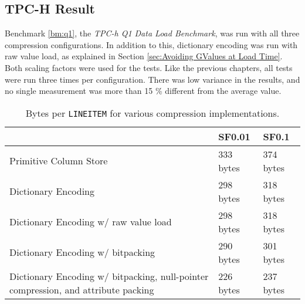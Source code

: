 \subsection{TPC-H Result}
\label{sub:TPC-H Result}
Benchmark \ref{bm:q1}, the \textit{TPC-h Q1 Data Load Benchmark}, was run with all three compression configurations. In addition to this, dictionary encoding was run with raw value load, as explained in Section \ref{sec:Avoiding GValues at Load Time}. Both scaling factors were used for the tests. Like the previous chapters, all tests were run three times per configuration. There was low variance in the results, and no single measurement was more than 15 \% different from the average value.
\begin{table}
    \centering
    \begin{tabularx}{\textwidth}{X | X X}
        & SF0.01 & SF0.1 \\ 
        \hline
        \hline
        Primitive Column Store & 333 bytes & 374 bytes \\
        Dictionary Encoding & 298 bytes & 318 bytes \\
        Dictionary Encoding w/ raw value load & 298 bytes & 318 bytes \\
        Dictionary Encoding w/ bitpacking & 290 bytes & 301 bytes \\
        Dictionary Encoding w/ bitpacking, null-pointer compression, and attribute packing & 226 bytes & 237 bytes \\
    \end{tabularx}
    \caption{Bytes per \texttt{LINEITEM} for various compression implementations.} 
    \label{tab:dict-bpl}
\end{table}

